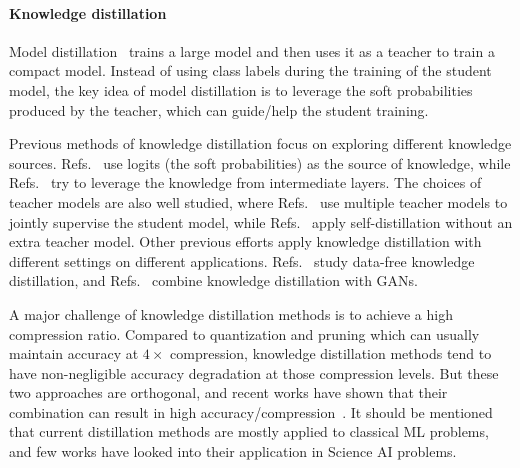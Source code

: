 \paragraph*{Knowledge distillation}
Model distillation~\cite{romero2014fitnets, hinton2015distilling, mishra2017apprentice, li2017learning, yim2017gift, polino2018model, ahn2019variational, yin2020dreaming} trains a large model and then uses it as a teacher to train a compact model. Instead of using class labels during the training of the student model, the key idea of model distillation is to leverage the soft probabilities produced by the teacher, 
which can guide/help the student training.

Previous methods of knowledge distillation focus on exploring different knowledge sources. Refs.~\cite{hinton2015distilling, li2017learning, park2019relational} use logits (the soft probabilities) as the source of knowledge, while Refs.~\cite{romero2014fitnets, yim2017gift, ahn2019variational} try to leverage the knowledge from intermediate layers. The choices of teacher models are also well studied, where Refs.~\cite{you2017learning, tarvainen2017mean} use multiple teacher models to jointly supervise the student model, while Refs.~\cite{crowley2018moonshine, zhang2019your} apply self-distillation without an extra teacher model. Other previous efforts apply knowledge distillation with different settings on different applications. Refs.~\cite{lopes2017data, nayak2019zero, yin2020dreaming} study data-free knowledge distillation, and Refs.~\cite{wang2018kdgan, wang2020minegan} combine knowledge distillation with GANs.

A major challenge of knowledge distillation methods is to achieve a high compression ratio. 
Compared to quantization and pruning which can usually maintain accuracy at $4\times$ compression, knowledge distillation methods tend to have non-negligible accuracy degradation at those compression levels. 
But these two approaches are orthogonal, and recent works have
shown that their combination can result in high accuracy/compression~\cite{polino2018model,mishra2017apprentice,yao2020hawqv3,mao2020ladabert}.
It should be mentioned that current distillation methods are mostly applied to classical ML problems, and few works have looked into their application in Science AI problems.


